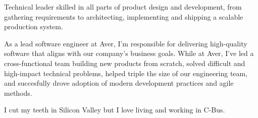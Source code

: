 

\begin{cvparagraph}

Technical leader skilled in all parts of product design and development, from gathering requirements to architecting, implementing and shipping a scalable production system.

As a lead software engineer at Aver, I'm responsible for delivering high-quality software that aligns with our company's business goals.
While at Aver, I've led a cross-functional team building new products from scratch, solved difficult and high-impact technical problems, helped triple the size of our engineering team, and succesfully drove adoption of modern development practices and agile methods.

I cut my teeth in Silicon Valley but I love living and working in C-Bus.

\end{cvparagraph}

